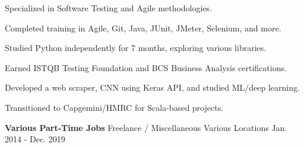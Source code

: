 \begin{cventries}
{      \begin{sloppypar}  
      \begin{cvitems}
        \item {Specialized in Software Testing and Agile methodologies.}
        \item {Completed training in Agile, Git, Java, JUnit, JMeter, Selenium, and more.}
        \item {Studied Python independently for 7 months, exploring various libraries.}
        \item {Earned ISTQB Testing Foundation and BCS Business Analysis certifications.}
        \item {Developed a web scraper, CNN using Keras API, and studied ML/deep learning.}
        \item {Transitioned to Capgemini/HMRC for Scala-based projects.}
      \end{cvitems}
      \end{sloppypar}
    }    

\cventry
    {\textbf{Various Part-Time Jobs}} 
    {Freelance / Miscellaneous} 
    {Various Locations} 
    {Jan. 2014 - Dec. 2019}
    {}      

\end{cventries}

